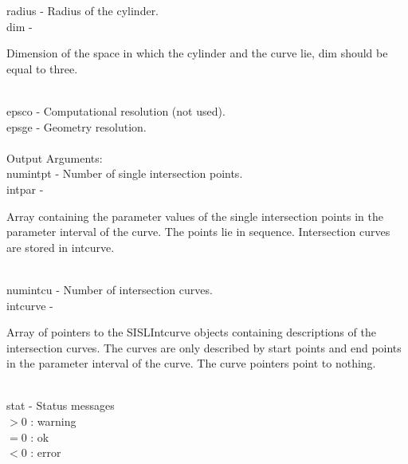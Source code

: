         \>\>    {\fov radius}   \> - \> Radius of the cylinder.\\
        \>\>    {\fov dim}      \> - \> \begin{minipg2}
                                Dimension of the space in which the
                                cylinder and the curve
                                lie, dim should be equal to three.
                                \end{minipg2}\\[0.3ex]
        \>\>    {\fov epsco}    \> - \> Computational resolution (not used).\\
        \>\>    {\fov epsge}    \> - \> Geometry resolution.\\
\\
        \>Output Arguments:\\
        \>\>    {\fov numintpt}\> - \>  Number of single intersection points.\\
        \>\>    {\fov intpar}   \> - \> \begin{minipg2}
                        Array containing the parameter values of the
                        single intersection points in the parameter
                        interval of the curve. The points lie in sequence.
                        Intersection curves are stored in intcurve.
                                \end{minipg2}\\[0.8ex]
        \>\>    {\fov numintcu}\> - \>Number of intersection curves.\\
        \>\>    {\fov intcurve}\> - \>  \begin{minipg2}
                        Array of pointers to the SISLIntcurve objects
                        containing descriptions of the intersection
                        curves. The curves are only described by start
                        points and end points in
                        the parameter interval of the curve. The curve
                        pointers point to nothing.
                                \end{minipg2}\\[0.8ex]
\newpagetabs
        \>\>    {\fov stat}     \> - \> Status messages\\
                \>\>\>\>\>              $> 0$   : warning\\
                \>\>\>\>\>              $= 0$   : ok\\
                \>\>\>\>\>              $< 0$   : error\\
